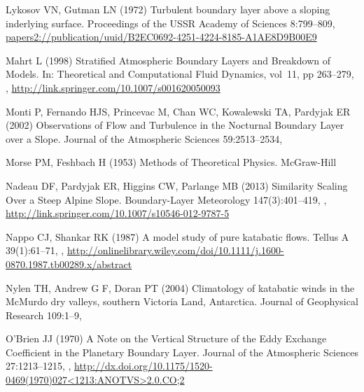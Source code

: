 \begin{thebibliography}{26}
Lykosov VN, Gutman LN (1972) {Turbulent boundary layer above a sloping
  inderlying surface}. Proceedings of the USSR Academy of Sciences 8:799--809,
  \urlprefix\url{papers2://publication/uuid/B2EC0692-4251-4224-8185-A1AE8D9B00E9}

Mahrt L (1998) {Stratified Atmospheric Boundary Layers and Breakdown of
  Models}. In: Theoretical and Computational Fluid Dynamics, vol~11, pp
  263--279, ,
  \urlprefix\url{http://link.springer.com/10.1007/s001620050093}

Monti P, Fernando HJS, Princevac M, Chan WC, Kowalewski TA, Pardyjak ER (2002)
  {Observations of Flow and Turbulence in the Nocturnal Boundary Layer over a
  Slope}. Journal of the Atmospheric Sciences 59:2513--2534,

Morse PM, Feshbach H (1953) {Methods of Theoretical Physics}. McGraw-Hill

Nadeau DF, Pardyjak ER, Higgins CW, Parlange MB (2013) {Similarity Scaling Over
  a Steep Alpine Slope}. Boundary-Layer Meteorology 147(3):401--419,
  ,
  \urlprefix\url{http://link.springer.com/10.1007/s10546-012-9787-5}

Nappo CJ, Shankar RK (1987) {A model study of pure katabatic flows}. Tellus A
  39(1):61--71, ,
  \urlprefix\url{http://onlinelibrary.wiley.com/doi/10.1111/j.1600-0870.1987.tb00289.x/abstract}

Nylen TH, {Andrew G F}, Doran PT (2004) {Climatology of katabatic winds in the
  McMurdo dry valleys, southern Victoria Land, Antarctica}. Journal of
  Geophysical Research 109:1--9, 

O'Brien JJ (1970) {A Note on the Vertical Structure of the Eddy Exchange
  Coefficient in the Planetary Boundary Layer}. Journal of the Atmospheric
  Sciences 27:1213--1215,
  ,
  \urlprefix\url{http://dx.doi.org/10.1175/1520-0469(1970)027<1213:ANOTVS>2.0.CO;2}


\end{thebibliography}
